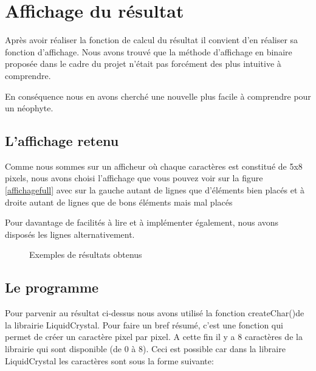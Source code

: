 \chapter{Affichage du résultat}
	Après avoir réaliser la fonction de calcul du résultat il convient d'en réaliser sa fonction d'affichage. 
    Nous avons trouvé que la méthode d'affichage en binaire proposée dans le cadre du projet n'était pas forcément des plus intuitive à comprendre.
    
    En conséquence nous en avons cherché une nouvelle plus facile à comprendre pour un néophyte.
    
\section{L'affichage retenu}
	Comme nous sommes sur un afficheur où chaque caractères est constitué de 5x8 pixels, nous avons choisi l'affichage que vous pouvez voir sur la figure \ref{affichagefull} avec sur la gauche autant de lignes que d'éléments bien placés et à droite autant de lignes que de bons éléments mais mal placés
    
  Pour davantage de facilités à lire et à implémenter également, nous avons disposés les lignes alternativement.
  
    \begin{figure}[h]
        \centering
        \hspace{5pt}
        \hspace{5pt}
        
        \caption{Exemples de résultats obtenus}
        \label{affichages}
    \end{figure}

  
\section{Le programme}
	Pour parvenir au résultat ci-dessus nous avons utilisé la fonction \og createChar()\footnotemark \fg de la librairie LiquidCrystal.
	Pour faire un bref résumé, c'est une fonction qui permet de créer un caractère pixel par pixel.
    A cette fin il y a 8 caractères de la librairie qui sont disponible (de 0 à 8).
    Ceci est possible car dans la libraire LiquidCrystal les caractères sont sous la forme suivante:
  
